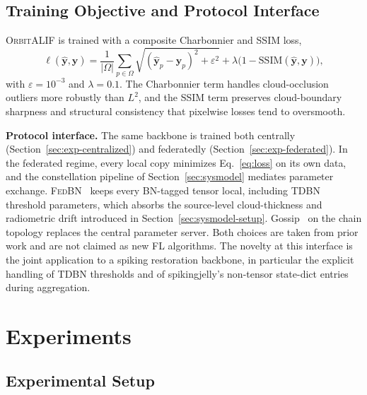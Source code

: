 \documentclass[conference]{IEEEtran}
\newcommand{\OrbitALIF}{\textsc{OrbitALIF}}
\begin{document}
\subsection{Training Objective and Protocol Interface}
\label{sec:framework-loss}

\OrbitALIF{} is trained with a composite Charbonnier and SSIM loss,
\begin{equation}
\ell(\hat{\mathbf{y}},\mathbf{y})
=
\frac{1}{|\Omega|}\!\sum_{p\in\Omega}
\sqrt{(\hat{\mathbf{y}}_p-\mathbf{y}_p)^2+\varepsilon^2}
+\lambda\bigl(1-\mathrm{SSIM}(\hat{\mathbf{y}},\mathbf{y})\bigr),
\label{eq:loss}
\end{equation}
with $\varepsilon\!=\!10^{-3}$ and $\lambda\!=\!0.1$. The
Charbonnier term handles cloud-occlusion outliers more robustly
than $L^2$, and the SSIM term preserves cloud-boundary sharpness
and structural consistency that pixelwise losses tend to
oversmooth.

\textbf{Protocol interface.} The same backbone is trained both
centrally (Section~\ref{sec:exp-centralized}) and federatedly
(Section~\ref{sec:exp-federated}). In the federated regime, every
local copy minimizes Eq.~\eqref{eq:loss} on its own data, and the
constellation pipeline of Section~\ref{sec:sysmodel} mediates
parameter exchange. \textsc{FedBN}~\cite{ref:fedbn} keeps every
BN-tagged tensor local, including TDBN threshold parameters, which
absorbs the source-level cloud-thickness and radiometric drift
introduced in Section~\ref{sec:sysmodel-setup}.
Gossip~\cite{ref:gossip-boyd} on the chain topology replaces the
central parameter server. Both choices are taken from prior work
and are not claimed as new FL algorithms. The novelty at this
interface is the joint application to a spiking restoration
backbone, in particular the explicit handling of TDBN thresholds
and of spikingjelly's non-tensor state-dict entries during
aggregation.

\section{Experiments}\label{sec:experiments}

\subsection{Experimental Setup}\label{sec:exp-setup}
\end{document}
